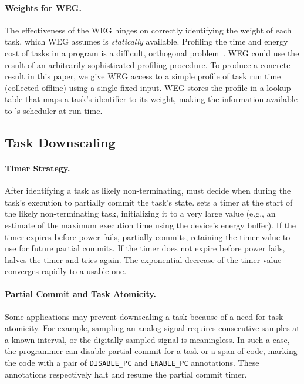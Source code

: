 \paragraph{Weights for WEG.}
The effectiveness of the WEG hinges on correctly identifying the weight of each task, which WEG assumes is {\em statically} available. Profiling the time and energy cost of tasks in a program is a difficult, orthogonal problem~\cite{cleancut_2018,baghsorkhi_cgo_2018}. WEG could use the result of an arbitrarily sophisticated profiling procedure. To produce a concrete result in this paper, we give WEG access to a simple profile of task run time (collected offline) using a single fixed input. WEG stores the profile in a lookup table that maps a task's identifier to its weight, making the information available to \sys's scheduler at run time.

%
\subsection{Task Downscaling}
%
%
\paragraph{Timer Strategy.}
After identifying a task as likely non-terminating, \sys must decide when during the task's execution to partially commit the task's state. \sys sets a timer at the start of the likely non-terminating task, initializing it to a very large value (e.g., an estimate of the maximum execution time using the device's energy buffer). If the timer expires before power fails, \sys partially commits, retaining  the timer value to use for future partial commits. If the timer does not expire before power fails, \sys halves the timer and tries again. The exponential decrease of the timer value converges rapidly to a usable one.

 \paragraph{Partial Commit and Task Atomicity.}
 Some applications may prevent
downscaling a task because of a need for task atomicity.  For example, sampling
an analog signal requires consecutive samples at a known interval, or the
digitally sampled signal is meaningless.  In such a case, the programmer can
disable partial commit for a task or a span of code, marking  the code with a
pair of \texttt{DISABLE\_PC} and \texttt{ENABLE\_PC} annotations.
These annotations respectively halt and resume the partial commit timer.

